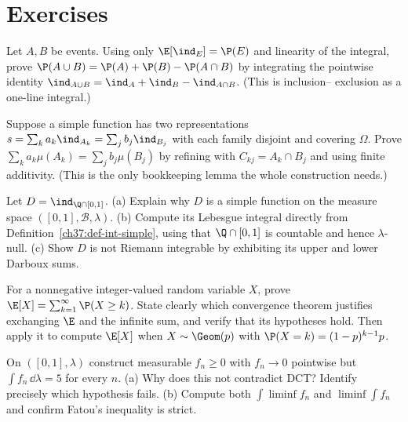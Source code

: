 \section{Exercises}
\label{ch37:exercises}

\begin{exercise}
\label{ch37:ex-indicator}
Let $A,B$ be events. Using only $\E[\ind_E]=\P(E)$ and linearity of the integral,
prove $\P(A\cup B)=\P(A)+\P(B)-\P(A\cap B)$ by integrating the pointwise
identity $\ind_{A\cup B}=\ind_A+\ind_B-\ind_{A\cap B}$. (This is inclusion--
exclusion as a one-line integral.)
\end{exercise}

\begin{exercise}
\label{ch37:ex-welldef}
Suppose a simple function has two representations $s=\sum_k a_k\ind_{A_k}=\sum_j
b_j\ind_{B_j}$ with each family disjoint and covering $\Omega$. Prove
$\sum_k a_k\mu(A_k)=\sum_j b_j\mu(B_j)$ by refining with $C_{kj}=A_k\cap B_j$
and using finite additivity. (This is the only bookkeeping lemma the whole
construction needs.)
\end{exercise}

\begin{exercise}
\label{ch37:ex-dirichlet}
Let $D=\ind_{\Q\cap[0,1]}$. (a) Explain why $D$ is a simple function on the
measure space $([0,1],\mathcal B,\lambda)$. (b) Compute its Lebesgue integral
directly from Definition~\ref{ch37:def-int-simple}, using that $\Q\cap[0,1]$ is
countable and hence $\lambda$-null. (c) Show $D$ is not Riemann integrable by
exhibiting its upper and lower Darboux sums.
\end{exercise}

\begin{exercise}
\label{ch37:ex-tailsum}
For a nonnegative integer-valued random variable $X$, prove
$\E[X]=\sum_{k=1}^\infty\P(X\ge k)$. State clearly which convergence theorem
justifies exchanging $\E$ and the infinite sum, and verify that its hypotheses
hold. Then apply it to compute $\E[X]$ when $X\sim\Geom(p)$ with
$\P(X=k)=(1-p)^{k-1}p$.
\end{exercise}

\begin{exercise}
\label{ch37:ex-bump}
On $([0,1],\lambda)$ construct measurable $f_n\ge 0$ with $f_n\to 0$ pointwise
but $\int f_n\,\dd\lambda = 5$ for every $n$. (a) Why does this not contradict
DCT? Identify precisely which hypothesis fails. (b) Compute both
$\int\liminf f_n$ and $\liminf\int f_n$ and confirm Fatou's inequality is
strict.
\end{exercise}


